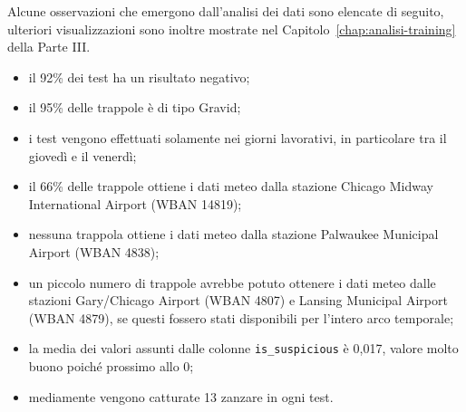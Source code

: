 Alcune osservazioni che emergono dall'analisi dei dati sono elencate di 
seguito, ulteriori visualizzazioni sono inoltre mostrate nel 
Capitolo~\ref{chap:analisi-training} della Parte III.
\begin{itemize}
	\item il 92\% dei test ha un risultato negativo;
	\item il 95\% delle trappole è di tipo Gravid;
	\item i test vengono effettuati solamente nei giorni lavorativi, in 
	particolare tra il giovedì e il venerdì;
	\item il 66\% delle trappole ottiene i dati meteo dalla stazione Chicago 
	Midway International Airport (WBAN 14819);
	\item nessuna trappola ottiene i dati meteo dalla stazione Palwaukee 
	Municipal Airport (WBAN 4838);
	\item un piccolo numero di trappole avrebbe potuto ottenere i dati meteo 
	dalle stazioni Gary/Chicago Airport (WBAN 4807) e Lansing Municipal Airport 
	(WBAN 4879), se questi fossero stati disponibili per l'intero arco 
	temporale;
	\item la media dei valori assunti dalle colonne \texttt{is\_suspicious} è 
	0,017, valore molto buono poiché prossimo allo 0;
	\item mediamente vengono catturate 13 zanzare in ogni test.
\end{itemize} 
